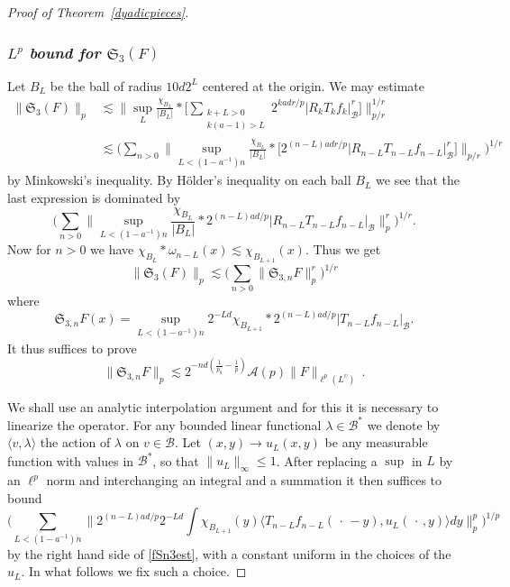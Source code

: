 \documentclass[11pt]{amsart}
\theoremstyle{definition}
\numberwithin{theorem}{section}
\numberwithin{definition}{section}
\renewcommand{\wp}{\upsilon}
\def\inn#1#2{\langle#1,#2\rangle}
\def\biginn#1#2{\big\langle#1,#2\big\rangle}
\newcommand{\Be}{\begin{equation}}
\newcommand{\Ee}{\end{equation}}
\newcommand{\note}[1]{\footnote{\texttt{\Small #1}}}
\def\sB{{\mathscr{B}}}
\def\inn#1#2{\langle#1,#2\rangle}
\def\biginn#1#2{\big\langle#1,#2\big\rangle}
\def\lc{\lesssim}
\def\la{\lambda}             \def\La{\Lambda}
\def\om{\omega}              \def\Om{\Omega}
\def\fS{{\mathfrak {S}}}
\def\cA{{\mathcal {A}}}
\begin{document}
\begin{proof}[Proof of Theorem~\ref{dyadicpieces}]
\subsubsection*{{\it $L^p$ bound for $\fS_3(F)$}}


Let $B_L$ be the ball of radius $10 d 2^L$  centered at the origin.
We may estimate
\begin{align*}
\big\| \fS_3(F)\big\|_p&\lc
\Big\|\sup_L  \frac{\chi_{B_L}}{|B_L|} *\Big[ \sum_{\substack{k+L>0\\k(a-1)>L}}
2^{kad r/p} |R_k{T}_{k} f_{k}|_{\sB}^r\Big]\Big\|_{p/r}^{1/r}
\\
&\lc \Big(\sum_{n>0} \Big\|\sup_{L<(1-a^{-1})n}
\frac{\chi_{B_L}}{|B_L|} *\big[
2^{(n-L)ad r/p} |R_{n-L}{T}_{n-L} f_{n-L}|_{\sB}^r\big]\Big\|_{p/r}\Big)^{1/r}
\end{align*}
by  Minkowski's inequality.
By H\"older's inequality on each ball $B_L$ we see that
 the last expression is dominated by
$$
\Big(\sum_{n>0}\Big\|
\sup_{L<(1-a^{-1})n}
\frac{\chi_{B_L}}{|B_L|} *
2^{(n-L)ad /p} |R_{n-L}{T}_{n-L} f_{n-L}|_{\sB}
\Big\|_p^r\Big)^{1/r}.
$$
Now
for $n>0$ we have
$\chi_{B_L}*\om_{n-L}(x)\lc \chi_{B_{L+1}}(x)$. Thus   we get
$$\big\| \fS_3(F)\big\|_p\lc
\Big(\sum_{n>0} \|\fS_{3,n} F\|_p^r\Big)^{1/r}$$
where
$$\fS_{3,n} F(x) =
\sup_{L<(1-a^{-1})n}
2^{-Ld}\chi_{B_{L+1}} *
2^{(n-L)ad /p} |T_{n-L} f_{n-L}|_{\sB}.
$$
It thus suffices to prove
\Be \label{fSn3est}
\|\fS_{3,n} F\|_p \lc 2^{-n d(\frac{1}{p_0}-\frac 1p)} \cA( p)
\|F\|_{\ell^p(L^{\wp})}
\,.
\Ee

We shall use an analytic interpolation argument and for this it  is
necessary to linearize the operator.
For any bounded linear functional $\la\in \sB^*$ we denote by
$\inn{v}{\la}$ the action of  $\la$ on  $v\in \sB$.
Let $(x,y)\to u_L(x,y)$ be any measurable function with values in $\sB^*$,
so that $ \|u_L\|_\infty\le 1$. After replacing a $\sup$ in $L$ by an $\ell^p$
norm and interchanging an integral and a summation
it then suffices to bound
$$\Big(\sum_{L<(1-a^{-1})n}\Big\|
 2^{(n-L)ad /p}
2^{-Ld}\int \chi_{B_{L+1}}(y)
 \biginn{T_{n-L} f_{n-L}(\,\cdot\, -y)}{u_L(\,\cdot\,,y)} dy
\Big\|_p^p\Big)^{1/p}
$$
by the right hand side of \eqref{fSn3est}, with a constant uniform in the
choices of the $u_L$.
In what follows we fix such a choice.






\end{proof}
\end{document}
